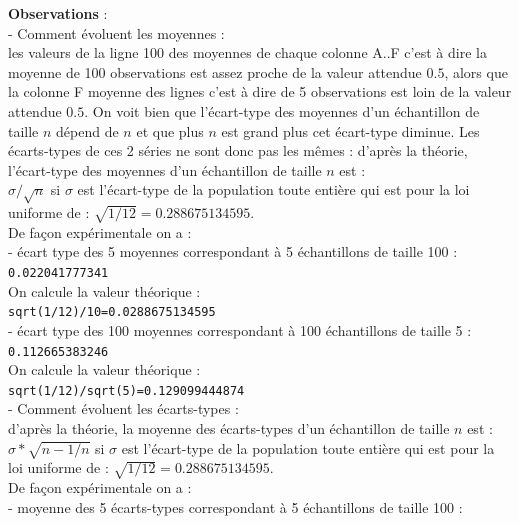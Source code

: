 \documentclass[a4paper,11pt]{book}
\begin{document}
{\bf Observations} :\\
- Comment \'evoluent les moyennes :\\
les valeurs de la ligne 100 des moyennes de chaque colonne A..F 
c'est \`a dire la moyenne de 100 observations est assez proche de la valeur attendue $0.5$, alors que la colonne F 
moyenne des lignes c'est \`a dire de 5 observations est loin  de la valeur attendue $0.5$. On voit bien que l'\'ecart-type des moyennes d'un \'echantillon de taille $n$ d\'epend de $n$ et que plus $n$ est grand plus cet \'ecart-type diminue.
Les \'ecarts-types de ces 2 s\'eries ne sont donc pas les m\^emes :
d'apr\`es la th\'eorie, l'\'ecart-type des moyennes d'un \'echantillon de 
taille $n$ est :\\
$\sigma/\sqrt n$ si $\sigma$ est l'\'ecart-type de la population toute
 enti\`ere qui est pour la loi uniforme de : $\sqrt{1/12}=0.288675134595$.\\
De fa\c{c}on exp\'erimentale on  a :\\
- \'ecart type des 5 moyennes correspondant \`a 5 \'echantillons de taille 100 :\\
{\tt 0.022041777341}\\
On calcule la valeur th\'eorique :\\
{\tt sqrt(1/12)/10=0.0288675134595}\\
- \'ecart type des 100 moyennes correspondant \`a 100 \'echantillons de taille 5 :\\
{\tt 0.112665383246}\\
On calcule la valeur th\'eorique :\\
{\tt sqrt(1/12)/sqrt(5)=0.129099444874}\\
- Comment \'evoluent les \'ecarts-types :\\
 d'apr\`es la th\'eorie, la moyenne des \'ecarts-types d'un \'echantillon de 
taille $n$ est :\\
$\sigma*\sqrt {n-1/n}$ si $\sigma$ est l'\'ecart-type de la population toute enti\`ere qui est pour la loi uniforme de : $\sqrt{1/12}=0.288675134595$.\\
De fa\c{c}on exp\'erimentale on  a :\\
- moyenne des 5 \'ecarts-types correspondant \`a 5 \'echantillons de taille 100 :\\
\end{document}
